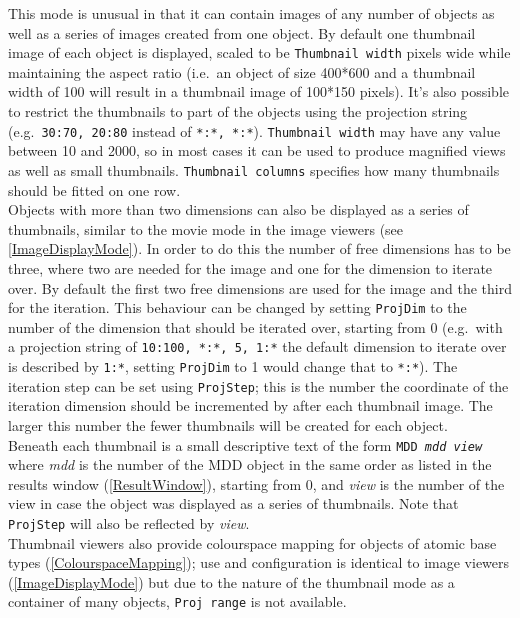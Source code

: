 \documentclass[11pt]{article}
\begin{document}
This mode is unusual in that it can contain images of any number of objects as well
as a series of images created from one object. By default one thumbnail image of each object
is displayed, scaled to be \texttt{Thumbnail width} pixels wide while maintaining the
aspect ratio (i.e.\ an object of size 400*600 and a thumbnail width of 100 will result
in a thumbnail image of 100*150 pixels). It's also possible to restrict the thumbnails
to part of the objects using the projection string (e.g.\ \texttt{30:70, 20:80} instead
of \texttt{*:*, *:*}). \texttt{Thumbnail width} may have any value between 10 and 2000, so
in most cases it can be used to produce magnified views as well as small thumbnails.
\texttt{Thumbnail columns} specifies how many thumbnails should be fitted on one
row.\\
Objects with more than two dimensions can also be displayed as a series of thumbnails,
similar to the movie mode in the image viewers (see \ref{ImageDisplayMode}). In order
to do this the number of free dimensions has to be three, where two are needed for the
image and one for the dimension to iterate over. By default the first two free
dimensions are used for the image and the third for the iteration. This behaviour
can be changed by setting \texttt{ProjDim} to the number of the dimension that should
be iterated over, starting from 0 (e.g.\ with a projection string of
\texttt{10:100, *:*, 5, 1:*} the default dimension to iterate over is described by
\texttt{1:*}, setting \texttt{ProjDim} to 1 would change that to \texttt{*:*}). The iteration
step can be set using \texttt{ProjStep}; this is the number the coordinate of the
iteration dimension should be incremented by after each thumbnail image. The larger
this number the fewer thumbnails will be created for each object.\\
Beneath each thumbnail is a small descriptive text of the form \texttt{MDD \textsl{mdd}
\lbrack \textsl{view} \rbrack} where \textsl{mdd} is the number of the MDD object in
the same order as listed in the results window (\ref{ResultWindow}), starting from 0,
and \textsl{view} is the number of the view in case the object was displayed as a series
of thumbnails. Note that \texttt{ProjStep} will also be reflected by \textsl{view}.\\
Thumbnail viewers also provide colourspace mapping for objects of atomic base types
(\ref{ColourspaceMapping}); use and configuration is identical to image viewers
(\ref{ImageDisplayMode}) but due to the nature of the thumbnail mode as a container
of many objects, \texttt{Proj range} is not available.
\end{document}
